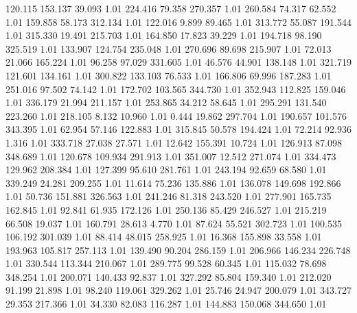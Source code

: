  120.115  153.137   39.093         1.01
 224.416   79.358  270.357         1.01
 260.584   74.317   62.552         1.01
 159.858   58.173  312.134         1.01
 122.016    9.899   89.465         1.01
 313.772   55.087  191.544         1.01
 315.330   19.491  215.703         1.01
 164.850   17.823   39.229         1.01
 194.718   98.190  325.519         1.01
 133.907  124.754  235.048         1.01
 270.696   89.698  215.907         1.01
  72.013   21.066  165.224         1.01
  96.258   97.029  331.605         1.01
  46.576   44.901  138.148         1.01
 321.719  121.601  134.161         1.01
 300.822  133.103   76.533         1.01
 166.806   69.996  187.283         1.01
 251.016   97.502   74.142         1.01
 172.702  103.565  344.730         1.01
 352.943  112.825  159.046         1.01
 336.179   21.994  211.157         1.01
 253.865   34.212   58.645         1.01
 295.291  131.540  223.260         1.01
 218.105    8.132   10.960         1.01
   0.444   19.862  297.704         1.01
 190.657  101.576  343.395         1.01
  62.954   57.146  122.883         1.01
 315.845   50.578  194.424         1.01
  72.214   92.936    1.316         1.01
 333.718   27.038   27.571         1.01
  12.642  155.391   10.724         1.01
 126.913   87.098  348.689         1.01
 120.678  109.934  291.913         1.01
 351.007   12.512  271.074         1.01
 334.473  129.962  208.384         1.01
 127.399   95.610  281.761         1.01
 243.194   92.659   68.580         1.01
 339.249   24.281  209.255         1.01
  11.614   75.236  135.886         1.01
 136.078  149.698  192.866         1.01
  50.736  151.881  326.563         1.01
 241.246   81.318  243.520         1.01
 277.901  165.735  162.845         1.01
  92.841   61.935  172.126         1.01
 250.136   85.429  246.527         1.01
 215.219   66.508   19.037         1.01
 160.791   28.613    4.770         1.01
  87.624   55.521  302.723         1.01
 100.535  106.192  301.039         1.01
  88.414   48.015  258.925         1.01
  16.368  155.898   33.558         1.01
 193.963  105.817  257.113         1.01
 139.490   90.204  286.159         1.01
 206.966  146.234  226.748         1.01
 330.544  113.344  210.067         1.01
 289.775   99.528   60.345         1.01
 115.032   78.698  348.254         1.01
 200.071  140.433   92.837         1.01
 327.292   85.804  159.340         1.01
 212.020   91.199   21.898         1.01
  98.240  119.061  329.262         1.01
  25.746   24.947  200.079         1.01
 343.727   29.353  217.366         1.01
  34.330   82.083  116.287         1.01
 144.883  150.068  344.650         1.01
